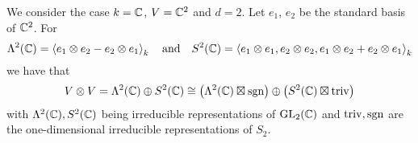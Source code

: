 \begin{example}
  We consider the case $k = \mathbb{C}$, $V = \mathbb{C}^2$ and $d = 2$.
  Let $e_1$, $e_2$ be the standard basis of $\mathbb{C}^2$.
  For
  \[
      \Lambda^2(\mathbb{C})
    = \left\langle  e_1 \otimes e_2 - e_2 \otimes e_1  \right\rangle_k
    \quad\text{and}\quad
      S^2(\mathbb{C})
    = \left\langle  e_1 \otimes e_1, e_2 \otimes e_2, e_1 \otimes e_2 + e_2 \otimes e_1  \right\rangle_k
  \]
  we have that
  \[
          V \otimes V
    =     \Lambda^2(\mathbb{C}) \oplus S^2(\mathbb{C})
    \cong        \left( \Lambda^2(\mathbb{C}) \boxtimes \operatorname{sgn} \right)
          \oplus \left( S^2(\mathbb{C}) \boxtimes {\operatorname{triv}} \right)
  \]
  with $\Lambda^2(\mathbb{C}), S^2(\mathbb{C})$ being irreducible representations of $\operatorname{GL}_2(\mathbb{C})$ and ${\operatorname{triv}}, \operatorname{sgn}$ are the one-dimensional irreducible representations of $S_2$.
  
%     

\end{example}
